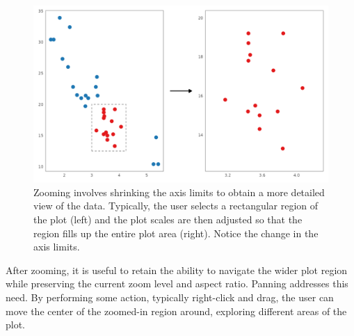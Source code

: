 \documentclass[
]{book}
\begin{document}
\begin{figure}

{\centering \includegraphics[width=20.83in]{./figures/zooming} 

}

\caption{Zooming involves shrinking the axis limits to obtain a more detailed view of the data. Typically, the user selects a rectangular region of the plot (left) and the plot scales are then adjusted so that the region fills up the entire plot area (right). Notice the change in the axis limits.}\label{fig:zooming}
\end{figure}

After zooming, it is useful to retain the ability to navigate the wider plot region while preserving the current zoom level and aspect ratio. Panning addresses this need. By performing some action, typically right-click and drag, the user can move the center of the zoomed-in region around, exploring different areas of the plot.
\end{document}
